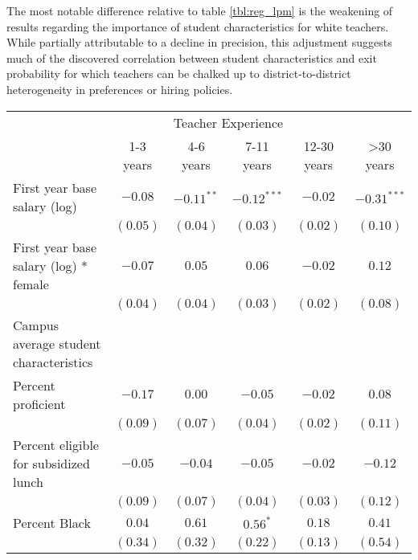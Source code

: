 \documentclass[]{article}
\begin{document}
The most notable difference relative to table \ref{tbl:reg_lpm} is the
weakening of results regarding the importance of student characteristics
for white teachers. While partially attributable to a decline in
precision, this adjustment suggests much of the discovered correlation
between student characteristics and exit probability for which teachers
can be chalked up to district-to-district heterogeneity in preferences
or hiring policies.

\begin{table}
\begin{center}
\begin{tabular}{l c c c c c }
\hline
 & \multicolumn{4}{c}{Teacher Experience} \\ \cline{2-6}
 & 1-3 years & 4-6 years & 7-11 years & 12-30 years & >30 years \\
\hline
First year base salary (log)                & $-0.08$      & $-0.11^{**}$ & $-0.12^{***}$ & $-0.02$      & $-0.31^{***}$ \\
                                            & $(0.05)$     & $(0.04)$     & $(0.03)$      & $(0.02)$     & $(0.10)$      \\
First year base salary (log) * female       & $-0.07$      & $0.05$       & $0.06$        & $-0.02$      & $0.12$        \\
                                            & $(0.04)$     & $(0.04)$     & $(0.03)$      & $(0.02)$     & $(0.08)$      \\
Campus average student characteristics      &              &              &               &              &               \\
\quad Percent proficient                    & $-0.17$      & $0.00$       & $-0.05$       & $-0.02$      & $0.08$        \\
                                            & $(0.09)$     & $(0.07)$     & $(0.04)$      & $(0.02)$     & $(0.11)$      \\
\quad Percent eligible for subsidized lunch & $-0.05$      & $-0.04$      & $-0.05$       & $-0.02$      & $-0.12$       \\
                                            & $(0.09)$     & $(0.07)$     & $(0.04)$      & $(0.03)$     & $(0.12)$      \\
\quad Percent Black                         & $0.04$       & $0.61$       & $0.56^{*}$    & $0.18$       & $0.41$        \\
                                            & $(0.34)$     & $(0.32)$     & $(0.22)$      & $(0.13)$     & $(0.54)$      \\

\end{tabular}
\end{center}
\end{table}
\end{document}
